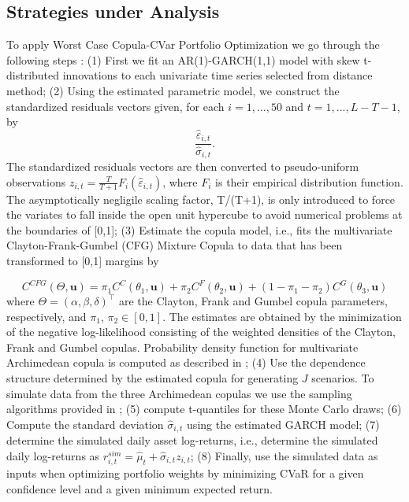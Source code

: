 \documentclass[a4paper,10pt]{article}
\begin{document}
\subsection{Strategies under Analysis}

To apply Worst Case Copula-CVar Portfolio Optimization we go through the
following steps : (1) First we fit an AR(1)-GARCH(1,1) model with skew t-distributed
innovations to each univariate time series selected from distance method;
(2) Using the estimated parametric model, we construct the standardized
residuals vectors given, for each $i=1,...,50$ and $t=1,...,L-T-1$, by
\begin{equation*}
\frac{\widehat{\varepsilon }_{i,t}}{\widehat{\sigma }_{i,t}}.
\end{equation*}%
The standardized residuals vectors are then converted to pseudo-uniform
observations $z_{i,t}=\frac{T}{T+1}F_{i}\left( \widehat{\varepsilon }%
_{i,t}\right) $, where $F_{i}$ is their empirical distribution function. The asymptotically negligile scaling factor, T/(T+1), is only introduced to force the variates to fall inside the open unit hypercube to avoid numerical problems at the boundaries of [0,1]; (3)
Estimate the copula model, i.e., fits the multivariate Clayton-Frank-Gumbel
(CFG) Mixture Copula to data that has been transformed to [0,1] margins by

\begin{equation}
C^{CFG}( \Theta ,\mathbf{u}) =\pi _{1}C^{C}( \theta _{1},\mathbf{u}) +\pi
_{2}C^{F}( \theta _{2},\mathbf{u}) +(1-\pi _{1}-\pi _{2}) C^{G}( \theta _{3},%
\mathbf{u})
\end{equation}
where $\Theta=\left(\alpha,\beta,\delta\right)^{\top }$ are the Clayton,
Frank and Gumbel copula parameters, respectively, and $\pi_{1}$, $\pi_{2}
\in [0,1]$. The estimates are obtained by the minimization of the negative
log-likelihood consisting of the weighted densities of the Clayton, Frank
and Gumbel copulas. Probability density function for multivariate
Archimedean copula is computed as described in \citet*{mcneil2009}; (4) Use
the dependence structure determined by the estimated copula for generating $%
J $ scenarios. To simulate data from the three Archimedean copulas we use
the sampling algorithms provided in \citet*{melchiori2006}; (5) compute
t-quantiles for these Monte Carlo draws; (6) Compute the standard deviation $%
\widehat{\sigma }_{i,t}$ using the estimated GARCH model; (7) determine the
simulated daily asset log-returns, i.e., determine the simulated daily
log-returns as $r_{i,t}^{sim}=\widehat{\mu }_{t}+\widehat{\sigma }%
_{i,t}z_{i,t}$; (8) Finally, use the simulated data as inputs when
optimizing portfolio weights by minimizing CVaR for a given confidence level
and a given minimum expected return.
\end{document}
